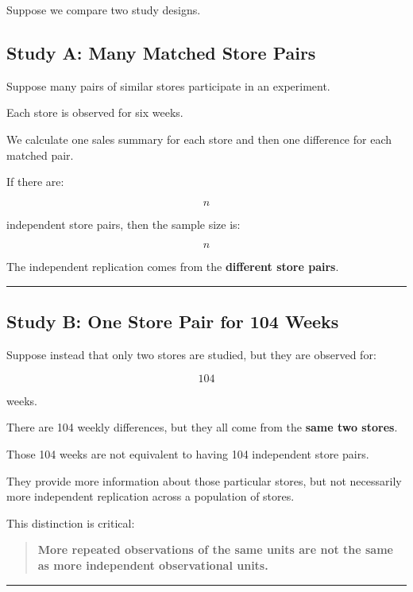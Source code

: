 \documentclass[
  letterpaper,
  DIV=11,
  numbers=noendperiod]{scrreprt}
\begin{document}
Suppose we compare two study designs.

\subsection{Study A: Many Matched Store
Pairs}\label{study-a-many-matched-store-pairs}

Suppose many pairs of similar stores participate in an experiment.

Each store is observed for six weeks.

We calculate one sales summary for each store and then one difference
for each matched pair.

If there are:

\[
n
\]

independent store pairs, then the sample size is:

\[
n
\]

The independent replication comes from the \textbf{different store
pairs}.

\begin{center}\rule{0.5\linewidth}{0.5pt}\end{center}

\subsection{Study B: One Store Pair for 104
Weeks}\label{study-b-one-store-pair-for-104-weeks}

Suppose instead that only two stores are studied, but they are observed
for:

\[
104
\]

weeks.

There are 104 weekly differences, but they all come from the
\textbf{same two stores}.

Those 104 weeks are not equivalent to having 104 independent store
pairs.

They provide more information about those particular stores, but not
necessarily more independent replication across a population of stores.

This distinction is critical:

\begin{quote}
\textbf{More repeated observations of the same units are not the same as
more independent observational units.}
\end{quote}

\begin{center}\rule{0.5\linewidth}{0.5pt}\end{center}
\end{document}
